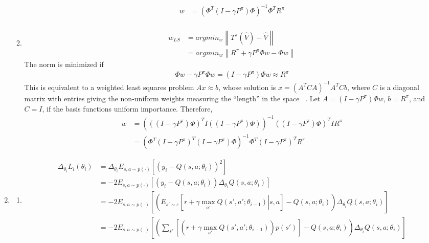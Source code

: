 \documentclass{article}
\newcommand*{\0}{\Vec{0}}
\newcommand*{\De}{\Delta}
\newcommand*{\ga}{\gamma}
\begin{document}
\begin{enumerate}
\begin{enumerate}
\begin{align*}
					w &= \left(\Phi^T \left(I - \ga P^\pi \right)\Phi\right)^{-1}\Phi^T R^\pi \\
				\end{align*}
			\item
				\begin{align*}
					w_{LS}
					&= argmin_w \left\| T^\pi(\hat{V}) -\hat{V} \right\| \\
					&= argmin_w \left\| R^\pi + \ga P^\pi \Phi w -\Phi w \right\|
				\end{align*}
				The norm is minimized if
				\begin{align*}
					\Phi w - \ga P^\pi \Phi w = \left(I - \ga P^\pi\right) \Phi w  \approx R^\pi
				\end{align*}
				This is equivalent to a weighted least squares problem $Ax \approx b$, whose solution is $x = \left(A^T C A\right)^{-1} A^T C b$, where $C$ is a diagonal matrix with entries giving
				the non-uniform weights measuring the ``length'' in the space ~\cite{mahadevan}.
				Let $A = \left(I - \ga P^\pi\right) \Phi w$, $b = R^\pi$, and $C = I$, if the basis functions uniform importance.
				Therefore,
				\begin{align*}
					w
					&= \left(\left(\left(I - \ga P^\pi\right)\Phi\right)^T I \left(\left(I - \ga P^\pi\right)\Phi\right)\right)^{-1} \left(\left(I - \ga P^\pi\right)\Phi\right)^T I R^\pi \\
					&= \left(\Phi^T\left(I - \ga P^\pi\right)^T\left(I - \ga P^\pi\right)\Phi\right)^{-1} \Phi^T\left(I - \ga P^\pi\right)^T R^\pi
				\end{align*}
		\end{enumerate}
	\item
		\begin{enumerate}
			\item
				\begin{align*}
					\De_{\theta_i}L_i(\theta_i)
					&= \De_{\theta_i} E_{s,a\sim p(\cdot)}\left[\left(y_i - Q(s,a;\theta_i)\right)^2\right] \\
					&= -2E_{s,a\sim p(\cdot)}\left[\left(y_i - Q(s,a;\theta_i)\right)\De_{\theta_i}Q(s,a;\theta_i)\right] \\
					&= -2E_{s,a\sim p(\cdot)}\left[\left(E_{s'\sim\varepsilon}\left[\left.r + \ga\max_{a'}Q(s',a';\theta_{i-1})\right|s,a\right] - Q(s,a;\theta_i)\right)\De_{\theta_i}Q(s,a;\theta_i)\right] \\
					&= -2E_{s,a\sim p(\cdot)}\left[\left(\sum_{s'}\left[\left(r + \ga\max_{a'}Q(s',a';\theta_{i-1})\right)p(s')\right] - Q(s,a;\theta_i)\right)\De_{\theta_i}Q(s,a;\theta_i)\right] \\

\end{align*}
\end{enumerate}
\end{enumerate}
\end{document}
